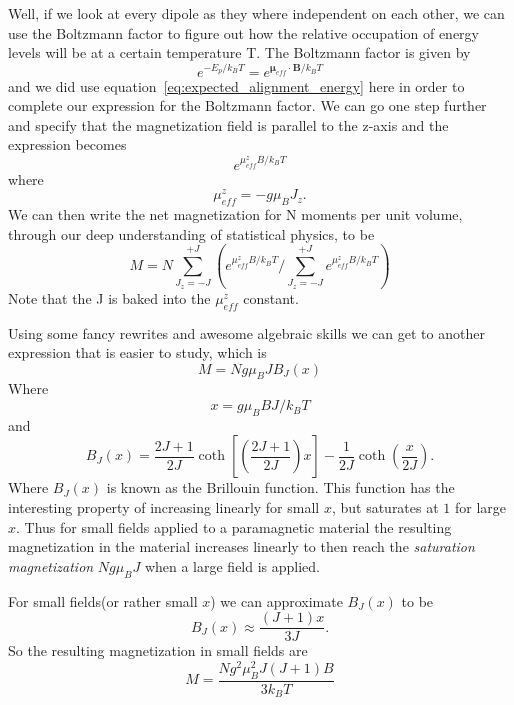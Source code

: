 \documentclass[11pt]{article}
\begin{document}
Well, if we look at every dipole as they where independent on each other, we can use the Boltzmann factor to figure out how the relative occupation of energy levels will be at a certain temperature T. The Boltzmann factor is given by
\begin{equation}
	e^{-E_p/k_B T} = e^{\pmb{\mu}_{eff} \cdot \pmb{B} / k_B T}
\end{equation}
and we did use equation~\ref{eq:expected_alignment_energy} here in order to complete our expression for the Boltzmann factor. We can go one step further and specify that the magnetization field is parallel to the z-axis and the expression becomes
\begin{equation}
	e^{\mu_{eff}^z B/k_B T}
\end{equation}
where 
\begin{equation}
	\mu_{eff}^z = -g\mu_B J_z.
\end{equation}
We can then write the net magnetization for N moments per unit volume, through our deep understanding of statistical physics, to be
\begin{equation}
	M = N \sum^{+J}_{J_z = -J} (e^{\mu_{eff}^z B/k_B T} / \sum^{+J}_{J_z = -J} e^{\mu_{eff}^z B/k_B T})
\end{equation}
Note that the J is baked into the $\mu_{eff}^z$ constant.

\newpage
Using some fancy rewrites and awesome algebraic skills we can get to another expression that is easier to study, which is
\begin{equation}
	M = Ng\mu_B J B_J(x)
	\label{eq:paramagnetic-magnetization}
\end{equation}
Where 
\begin{equation}
	x = g \mu_B BJ/k_B T
\end{equation}
and 
\begin{equation}
	B_J(x) = \frac{2J+1}{2J} \coth{[(\frac{2J+1}{2J})x]} - \frac{1}{2J}\coth{(\frac{x}{2J})}.
\end{equation}
Where $B_J(x)$ is known as the Brillouin function. This function has the interesting property of increasing linearly for small $x$, but saturates at $1$ for large $x$. Thus for small fields applied to a paramagnetic material the resulting magnetization in the material increases linearly to then reach the \emph{saturation magnetization} $Ng\mu_B J$ when a large field is applied. 

For small fields(or rather small $x$) we can approximate $B_J(x)$ to be
\begin{equation}
	B_J(x) \approx \frac{(J+1)x}{3J}.
\end{equation}
So the resulting magnetization in small fields are
\begin{equation}
	M = \frac{N g^2 \mu_B^2 J(J+1)B}{3k_B T}
\end{equation}
\end{document}
